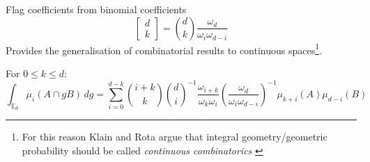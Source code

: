 Flag coefficients from binomial coefficients
\begin{equation}
  \begin{bmatrix} d \\ k \end{bmatrix}
  = {d \choose k}
  \frac{\omega_d}{\omega_i \omega_{d-i}}
\end{equation}
Provides the generalisation of combinatorial results to continuous spaces\footnote{For this reason Klain and Rota argue that integral geometry/geometric probability should be called \emph{continuous combinatorics} \cite{Klain1997}}.

\begin{theorem}
  For $0 \le k \le d$:
  \begin{equation}
    \int_{\mathbb{E}_d} \mu_i (A \cap g B) \, dg =
    \sum_{i=0}^{d-k} {i + k \choose k} {d \choose i}^{-1} \frac{\omega_{i+k}}{\omega_k \omega_i} \left(\frac{\omega_d}{\omega_i \omega_{d-i}} \right)^{-1} \mu_{k+i}(A) \mu_{d-i}(B)
  \end{equation}
\end{theorem}
